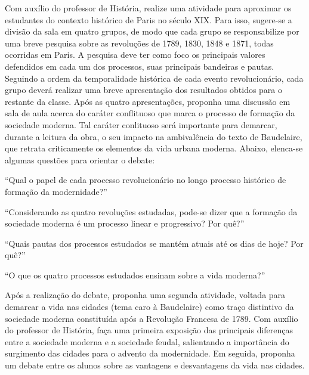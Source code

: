 \documentclass[12pt]{extarticle}
\begin{document}
Com auxílio do professor de História, realize uma atividade para aproximar os estudantes do contexto histórico de Paris no século XIX. Para isso, sugere-se a divisão da sala em quatro grupos, de modo que cada grupo se responsabilize por uma breve pesquisa sobre as revoluções de 1789, 1830, 1848 e 1871, todas ocorridas em Paris. A pesquisa deve ter como foco os principais valores defendidos em cada um dos processos, suas principais bandeiras e pautas. Seguindo a ordem da temporalidade histórica de cada evento revolucionário, cada grupo deverá realizar uma breve apresentação dos resultados obtidos para o restante da classe. Após as quatro apresentações, proponha uma discussão em sala de aula acerca do caráter conflituoso que marca o processo de formação da sociedade moderna. Tal caráter conlituoso será importante para demarcar, durante a leitura da obra, o seu impacto na ambivalência do texto de Baudelaire, que retrata criticamente os elementos da vida urbana moderna. Abaixo, elenca-se algumas questões para orientar o debate:

``Qual o papel de cada processo revolucionário no longo processo histórico de formação da modernidade?''

``Considerando as quatro revoluções estudadas, pode-se dizer que a formação da sociedade moderna é um processo linear e progressivo? Por quê?''

``Quais pautas dos processos estudados se mantém atuais até os dias de hoje? Por quê?''

``O que os quatro processos estudados ensinam sobre a vida moderna?''

Após a realização do debate, proponha uma segunda atividade, voltada para demarcar a vida nas cidades (tema caro à Baudelaire) como traço distintivo da sociedade moderna constituída após a Revolução Francesa de 1789. Com auxílio do professor de História, faça uma primeira exposição das principais diferenças entre a sociedade moderna e a sociedade feudal, salientando a importância do surgimento das cidades para o advento da modernidade. Em seguida, proponha um debate entre os alunos sobre as vantagens e desvantagens da vida nas cidades.


\end{document}

